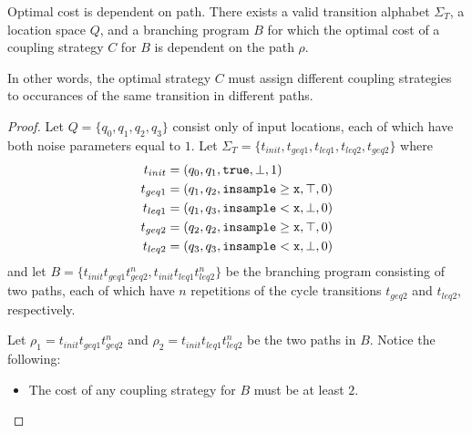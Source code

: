 \begin{prop}\label{costDependspathProp}
    Optimal cost is dependent on path. There exists a valid transition alphabet $\Sigma_T$, a location space $Q$, and a branching program $B$ for which the optimal cost of a coupling strategy $C$ for $B$ is dependent on the path $\rho$. 
    
    In other words, the optimal strategy $C$ must assign different coupling strategies to occurances of the same transition in different paths. 
\end{prop}

\begin{proof}
    Let $Q = \{q_0, q_1, q_2, q_3\}$ consist only of input locations, each of which have both noise parameters equal to $1$. Let $\Sigma_T = \{t_{init}, t_{geq1}, t_{leq1}, t_{leq2}, t_{geq2}\}$ where 
    \begin{align*}
        t_{init} &= (q_0, q_1, \texttt{true}, \bot, 1)\\
        t_{geq1} &= (q_1, q_2, \gguard[\texttt{x}], \top, 0)\\
        t_{leq1} &= (q_1, q_3, \lguard[\texttt{x}], \bot, 0)\\
        t_{geq2} &= (q_2, q_2, \gguard[\texttt{x}], \top, 0)\\
        t_{leq2} &= (q_3, q_3, \lguard[\texttt{x}], \bot, 0)
    \end{align*}
    and let $B = \{t_{init}t_{geq1}t_{geq2}^n, t_{init}t_{leq1}t_{leq2}^n\}$ be the branching program consisting of two paths, each of which have $n$ repetitions of the cycle transitions $t_{geq2}$ and $t_{leq2}$, respectively.

    Let $\rho_1 = t_{init}t_{geq1}t_{geq2}^n$ and $\rho_2 = t_{init}t_{leq1}t_{leq2}^n$ be the two paths in $B$. Notice the following: 
    
    \begin{itemize}
        \item The cost of any coupling strategy for $B$ must be at least $2$.
        

\end{itemize}
\end{proof}
